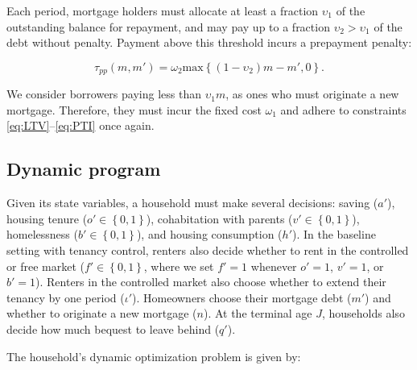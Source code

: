 \documentclass[parskip=full]{article}
\begin{document}
Each period, mortgage holders must allocate at least a fraction $\upsilon_{1}$ of the outstanding balance for repayment, and may pay up to a fraction $\upsilon_{2}>\upsilon_{1}$ of the debt without penalty. Payment above this threshold incurs a prepayment penalty:

\begin{equation}\label{eq:prepayment_penalty}
\tau_{pp}(m,m')=\omega_{2}\mbox{max}\left\{(1-\upsilon_{2})m-m',0\right\}.
\end{equation}

\noindent We consider borrowers paying less than $\upsilon_{1}m$, as ones who must originate a new mortgage. Therefore, they must incur the fixed cost $\omega_{1}$ and adhere to constraints \eqref{eq:LTV}--\eqref{eq:PTI} once again.

\subsection{Dynamic program}\label{subsection:household_optimization}
Given its state variables, a household must make several decisions: saving ($a'$), housing tenure ($o' \in \left\{0,1\right\}$), cohabitation with parents ($v' \in \left\{0,1\right\}$), homelessness ($b' \in \left\{0,1\right\}$), and housing consumption ($h'$). In the baseline setting with tenancy control, renters also decide whether to rent in the controlled or free market ($f' \in \left\{0,1\right\}$, where we set $f'=1$ whenever $o'=1$, $v'=1$, or $b'=1$). Renters in the controlled market also choose whether to extend their tenancy by one period ($\iota'$). Homeowners choose their mortgage debt ($m'$) and whether to originate a new mortgage ($n$). At the terminal age $J$, households also decide how much bequest to leave behind ($q'$).

The household's dynamic optimization problem is given by:
\end{document}
